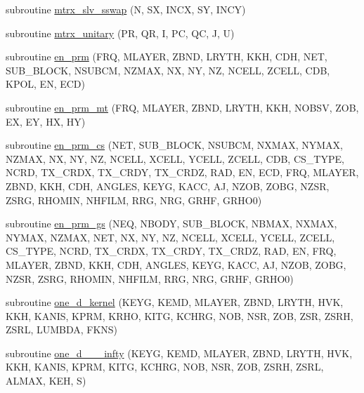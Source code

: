 \begin{DoxyCompactItemize}
subroutine \hyperlink{Marco_8f90_a41de629eee6c3a88f303346f2fe77e42}{mtrx\+\_\+slv\+\_\+sswap} (N, SX, I\+N\+CX, SY, I\+N\+CY)
\item 
subroutine \hyperlink{Marco_8f90_a4eb03ca80bb56e17c8df38828e960f09}{mtrx\+\_\+unitary} (PR, QR, I, PC, QC, J, U)
\item 
subroutine \hyperlink{Marco_8f90_aa315629893313c49aa9f1836084f80b6}{en\+\_\+prm} (F\+RQ, M\+L\+A\+Y\+ER, Z\+B\+ND, L\+R\+Y\+TH, K\+KH, C\+DH, N\+ET, S\+U\+B\+\_\+\+B\+L\+O\+CK, N\+S\+U\+B\+CM, N\+Z\+M\+AX, NX, NY, NZ, N\+C\+E\+LL, Z\+C\+E\+LL, C\+DB, K\+P\+OL, EN, E\+CD)
\item 
subroutine \hyperlink{Marco_8f90_a5cd1810beab2395c64ec9a3873337250}{en\+\_\+prm\+\_\+mt} (F\+RQ, M\+L\+A\+Y\+ER, Z\+B\+ND, L\+R\+Y\+TH, K\+KH, N\+O\+B\+SV, Z\+OB, EX, EY, HX, HY)
\item 
subroutine \hyperlink{Marco_8f90_a18b8a51feece5566bf2eabdfec68c2b3}{en\+\_\+prm\+\_\+cs} (N\+ET, S\+U\+B\+\_\+\+B\+L\+O\+CK, N\+S\+U\+B\+CM, N\+X\+M\+AX, N\+Y\+M\+AX, N\+Z\+M\+AX, NX, NY, NZ, N\+C\+E\+LL, X\+C\+E\+LL, Y\+C\+E\+LL, Z\+C\+E\+LL, C\+DB, C\+S\+\_\+\+T\+Y\+PE, N\+C\+RD, T\+X\+\_\+\+C\+R\+DX, T\+X\+\_\+\+C\+R\+DY, T\+X\+\_\+\+C\+R\+DZ, R\+AD, EN, E\+CD, F\+RQ, M\+L\+A\+Y\+ER, Z\+B\+ND, K\+KH, C\+DH, A\+N\+G\+L\+ES, K\+E\+YG, K\+A\+CC, AJ, N\+Z\+OB, Z\+O\+BG, N\+Z\+SR, Z\+S\+RG, R\+H\+O\+M\+IN, N\+H\+F\+I\+LM, R\+RG, N\+RG, G\+R\+HF, G\+R\+H\+O0)
\item 
subroutine \hyperlink{Marco_8f90_a6811caa6f5f24cf50a8f013171e9915c}{en\+\_\+prm\+\_\+gs} (N\+EQ, N\+B\+O\+DY, S\+U\+B\+\_\+\+B\+L\+O\+CK, N\+B\+M\+AX, N\+X\+M\+AX, N\+Y\+M\+AX, N\+Z\+M\+AX, N\+ET, NX, NY, NZ, N\+C\+E\+LL, X\+C\+E\+LL, Y\+C\+E\+LL, Z\+C\+E\+LL, C\+S\+\_\+\+T\+Y\+PE, N\+C\+RD, T\+X\+\_\+\+C\+R\+DX, T\+X\+\_\+\+C\+R\+DY, T\+X\+\_\+\+C\+R\+DZ, R\+AD, EN, F\+RQ, M\+L\+A\+Y\+ER, Z\+B\+ND, K\+KH, C\+DH, A\+N\+G\+L\+ES, K\+E\+YG, K\+A\+CC, AJ, N\+Z\+OB, Z\+O\+BG, N\+Z\+SR, Z\+S\+RG, R\+H\+O\+M\+IN, N\+H\+F\+I\+LM, R\+RG, N\+RG, G\+R\+HF, G\+R\+H\+O0)
\item 
subroutine \hyperlink{Marco_8f90_a9d38006ae4142553da9eed59f368bed7}{one\+\_\+d\+\_\+kernel} (K\+E\+YG, K\+E\+MD, M\+L\+A\+Y\+ER, Z\+B\+ND, L\+R\+Y\+TH, H\+VK, K\+KH, K\+A\+N\+IS, K\+P\+RM, K\+R\+HO, K\+I\+TG, K\+C\+H\+RG, N\+OB, N\+SR, Z\+OB, Z\+SR, Z\+S\+RH, Z\+S\+RL, L\+U\+M\+B\+DA, F\+K\+NS)
\item 
subroutine \hyperlink{Marco_8f90_aec081d732a45837d045636e3ab309eb3}{one\+\_\+d\+\_\+\_\+\_\+infty} (K\+E\+YG, K\+E\+MD, M\+L\+A\+Y\+ER, Z\+B\+ND, L\+R\+Y\+TH, H\+VK, K\+KH, K\+A\+N\+IS, K\+P\+RM, K\+I\+TG, K\+C\+H\+RG, N\+OB, N\+SR, Z\+OB, Z\+S\+RH, Z\+S\+RL, A\+L\+M\+AX, K\+EH, S)

\end{DoxyCompactItemize}
